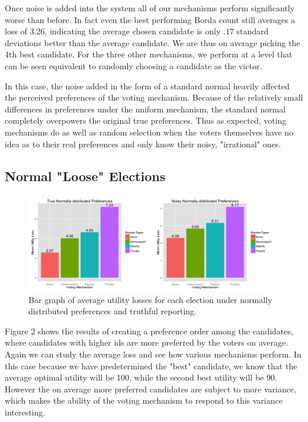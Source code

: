 \documentclass[11pt]{scrartcl}
\begin{document}
Once noise is added into the system all of our mechanisms perform significantly worse than before. In fact even the best performing Borda count still averages a loss of 3.26, indicating the average chosen candidate is only $.17$ standard deviations better than the average candidate. We are thus on average picking the 4th best candidate. For the three other mechanisms, we perform at a level that can be seen equivalent to randomly choosing a candidate as the victor.

In this case, the noise added in the form of a standard normal heavily affected the perceived preferences of the voting mechanism. Because of the relatively small differences in preferences under the uniform mechanism, the standard normal completely overpowers the original true preferences. Thus as expected, voting mechanisms do as well as random selection when the voters themselves have no idea as to their real preferences and only know their noisy, "irrational" ones.


\subsection{Normal "Loose" Elections}
\begin{figure}[H]\center
\includegraphics[scale=0.38]{normal.png}
\caption{Bar graph of average utility losses for each election under normally distributed preferences and truthful reporting.}
\end{figure}

Figure 2 shows the results of creating a preference order among the candidates, where candidates with higher ids are more preferred by the voters on average. Again we can study the average loss and see how various mechanisms perform. In this case because we have predetermined the "best" candidate, we know that the average optimal utility will be 100, while the second best utility will be 90. However the on average more preferred candidates are subject to more variance, which makes the ability of the voting mechanism to respond to this variance interesting.
\end{document}
